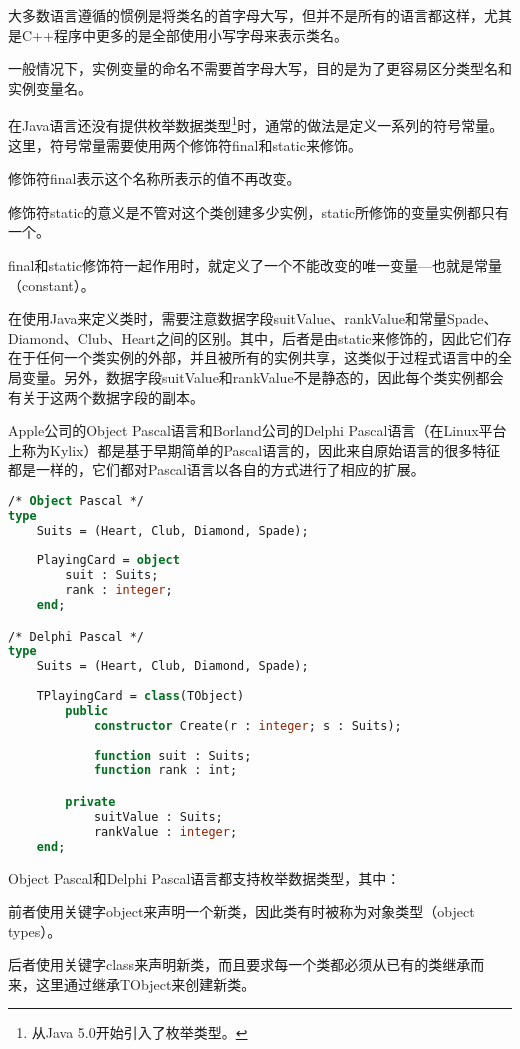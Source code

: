 大多数语言遵循的惯例是将类名的首字母大写，但并不是所有的语言都这样，尤其是C++程序中更多的是全部使用小写字母来表示类名。


一般情况下，实例变量的命名不需要首字母大写，目的是为了更容易区分类型名和实例变量名。


在Java语言还没有提供枚举数据类型\footnote{从Java 5.0开始引入了枚举类型。}时，通常的做法是定义一系列的符号常量。这里，符号常量需要使用两个修饰符final和static来修饰。

\begin{compactitem}
\item 修饰符final表示这个名称所表示的值不再改变。
\item 修饰符static的意义是不管对这个类创建多少实例，static所修饰的变量实例都只有一个。
\end{compactitem}

final和static修饰符一起作用时，就定义了一个不能改变的唯一变量—也就是常量（constant）。


在使用Java来定义类时，需要注意数据字段suitValue、rankValue和常量Spade、Diamond、Club、Heart之间的区别。其中，后者是由static来修饰的，因此它们存在于任何一个类实例的外部，并且被所有的实例共享，这类似于过程式语言中的全局变量。另外，数据字段suitValue和rankValue不是静态的，因此每个类实例都会有关于这两个数据字段的副本。

Apple公司的Object Pascal语言和Borland公司的Delphi Pascal语言（在Linux平台上称为Kylix）都是基于早期简单的Pascal语言的，因此来自原始语言的很多特征都是一样的，它们都对Pascal语言以各自的方式进行了相应的扩展。

\begin{lstlisting}[language=Pascal]
/* Object Pascal */
type 
	Suits = (Heart, Club, Diamond, Spade);
	
	PlayingCard = object
		suit : Suits;
		rank : integer;
	end;

/* Delphi Pascal */
type 
	Suits = (Heart, Club, Diamond, Spade);
	
	TPlayingCard = class(TObject)
		public 
			constructor Create(r : integer; s : Suits);
			
			function suit : Suits;
			function rank : int;

		private
			suitValue : Suits;
			rankValue : integer;
	end;
\end{lstlisting}



Object Pascal和Delphi Pascal语言都支持枚举数据类型，其中：

\begin{compactitem}
\item 前者使用关键字object来声明一个新类，因此类有时被称为对象类型（object types）。
\item 后者使用关键字class来声明新类，而且要求每一个类都必须从已有的类继承而来，这里通过继承TObject来创建新类。
\end{compactitem}


